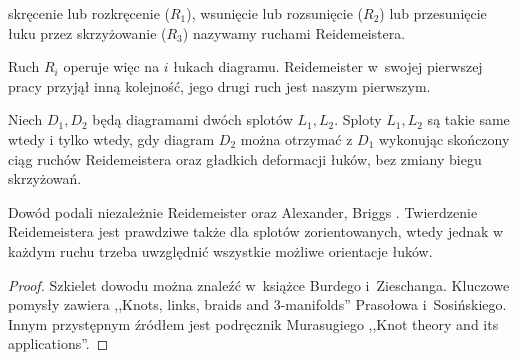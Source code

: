 \begin{definition}

    skręcenie lub rozkręcenie ($R_1$), wsunięcie lub rozsunięcie ($R_2$) lub przesunięcie łuku przez skrzyżowanie ($R_3$) nazywamy ruchami Reidemeistera.
\end{definition}

Ruch $R_i$ operuje więc na $i$ łukach diagramu.
Reidemeister w~swojej pierwszej pracy przyjął inną kolejność,
jego drugi ruch jest naszym pierwszym.

\begin{theorem}[Reidemeister, 1927]
    \label{thm:reidemeister}
    Niech $D_1, D_2$ będą diagramami dwóch splotów $L_1, L_2$.
    Sploty $L_1, L_2$ są takie same wtedy i tylko wtedy, gdy diagram $D_2$ można otrzymać z $D_1$ wykonując skończony ciąg ruchów Reidemeistera oraz gładkich deformacji łuków, bez zmiany biegu skrzyżowań.
\end{theorem}

Dowód podali niezależnie Reidemeister \cite{reidemeister27} oraz Alexander, Briggs \cite{briggs27}.
Twierdzenie Reidemeistera jest prawdziwe także dla splotów zorientowanych, wtedy jednak w każdym ruchu trzeba uwzględnić wszystkie możliwe orientacje łuków.

\begin{proof}
    Szkielet dowodu można znaleźć w~książce Burdego i~Zieschanga.
    Kluczowe pomysły zawiera ,,Knots, links, braids and $3$-manifolds''
    Prasołowa i~Sosińskiego.
    Innym przystępnym źródłem jest podręcznik \cite{murasugi96} Murasugiego ,,Knot theory and its applications''.
\end{proof}

